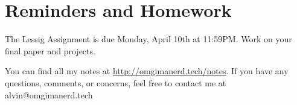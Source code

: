 \documentclass[letterpaper, 12pt]{article}
\begin{document}
\section*{Reminders and Homework}
The Lessig Assignment is due Monday, April 10th at 11:59PM.
Work on your final paper and projects.

\begin{center}
  You can find all my notes at \url{http://omgimanerd.tech/notes}. If you have
  any questions, comments, or concerns, feel free to contact me at
  alvin@omgimanerd.tech
\end{center}
\end{document}
